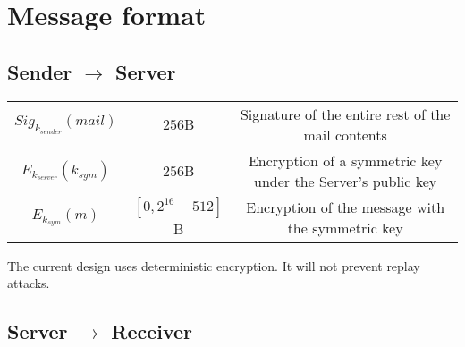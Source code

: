 \documentclass[11pt]{article}
\begin{document}
\section*{Message format}
\subsection*{Sender $\rightarrow$ Server}
\begin{tabular}{c c c}
  $Sig_{k_{sender}}\left(mail\right)$ & $256$B &
    Signature of the entire rest of the mail contents\\
  $E_{k_{server}}\left(k_{sym}\right)$ & $256$B &
    Encryption of a symmetric key under the Server's public key\\
  $E_{k_{sym}}\left(m\right)$ & $\left[0, 2^{16} - 512 \right]$B &
    Encryption of the message with the symmetric key
\end{tabular}
The current design uses deterministic encryption. It will not prevent replay
attacks.

\subsection*{Server $\rightarrow$ Receiver}
\end{document}
